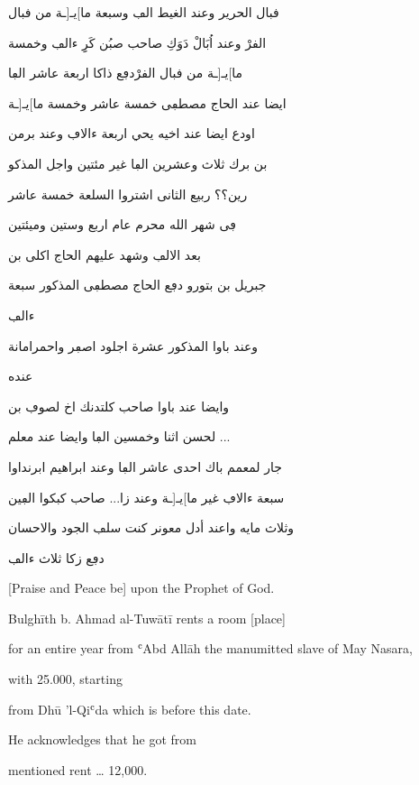 \documentclass[12pt]{article}
\newcommand{\n}         [1]     %
    {\bgroup\textdir TLT #1\egroup}
\begin{document}
\begin{pages}
\begin{Leftside}
\begin{txarab}
ڧبال الحرير وعند الغيط  الڢ وسبعة ما]يـ[ـة من ڧبال

الڧرْ وعند اُبَالْ دَوَكِ صاحب صبُن كَرِِ ءالڢ وخمسة

ما]يـ[ـة من ڧبال الڧرْدڢع ذاكا اربعة عاشر الڢا

ايضا عند الحاج مصطڢى خمسة عاشر وخمسة ما]يـ[ـة

اودع ايضا عند اخيه يحي اربعة ءالاڢ وعند برمن

بن برك ثلاث وعشرين الڢا غير مئتين واجل المذكو

رين؟؟ ربيع الثانى اشتروا السلعة خمسة عاشر

ڢى شهر الله محرم عام اربع وستين وميئتين

بعد الالڢ\arnote{ديسمبر  \n{1847}} وشهد عليهم الحاج اكلى بن

جبريل بن بتورو دڢع الحاج مصطڢى المذكور سبعة

ءالڢ

وعند باوا المذكور عشرة اجلود اصڢر واحمرامانة

عنده

وايضا عند باوا صاحب كلتدنك اخ لصوڢ بن

لحسن اثنا وخمسين الڢا وايضا عند معلم ...

جار لمعمم باك احدى عاشر الڢا وعند ابراهيم ابرنداوا

سبعة ءالاڢ غير ما]يـ[ـة وعند زا... صاحب كبكوا الڢين


وثلاث مايه واعند أدل معونر كنت سلڢ الجود والاحسان

دڢع زكا ثلاث ءالڢ
\end{txarab}
\pend
\endnumbering
\end{Leftside}


\begin{Rightside}

  
\beginnumberingR
\pstart[]

 \parindent=0pt
[Praise and Peace be] upon the Prophet of God.

Bulghīth b. Ahmad al-Tuwātī rents a room [place]

 for an entire year from ʿAbd Allāh the manumitted slave of May Nasara,

 with 25.000, starting

from Dhū 'l-Qiʿda which is before this date.

He acknowledges that he got from

mentioned rent {\dots} 12,000.


\end{Rightside}
\end{pages}
\end{document}
